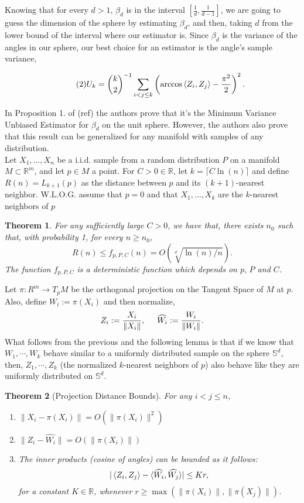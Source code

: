 \documentclass[12pt]{exam}
\def\R{\ensuremath{\mathbb{R}}}
\def\S{\ensuremath{\mathbb{S}}}
\newtheorem{theorem}{Theorem}[section]
\theoremstyle{remark}
\newcommand{\angles}[1]{\ensuremath{\left\langle}#1\ensuremath{\right\rangle} }
\begin{document}
Knowing that for every $d > 1$, $\beta_d$ is in the interval $[\tfrac{1}{d}, \tfrac{1}{d-1}]$, we are going to guess the dimension of the sphere by estimating $\beta_d$, and then, taking $d$ from the lower bound of the interval where our estimator is. Since $\beta_d$ is the variance of the angles in our sphere, our best choice for an estimator is the angle's sample variance,


\begin{equation}\label{ade:2}\tag{2}
  U_{k} = {k \choose 2}^{-1} \sum_{i<j\leq k}\left(
    \arccos\angles{Z_i, Z_j} - \frac{\pi^2}{2} 
    \right)^{2}.
\end{equation}

In Proposition 1. of (ref) the authors prove that it's the Minimum Variance Unbiased Estimator for $\beta_d$ on the unit sphere. However, the authors also prove that this result can be generalized for any manifold with samples of any distribution.\\[5mm]

Let $X_1,\ldots, X_n$ be a i.i.d. sample from a random distribution $P$ on a manifold $M \subset \R^m$, and let $p \in M$ a point. For $C>0 \in  \R$, let $k = \lceil C \ln(n)\rceil$ and define $R(n) = L_{k+1}(p)$ as the distance between $p$ and its $(k+1)$-nearest neighbor. W.L.O.G. assume that $p = 0$ and that $X_1,\ldots, X_k$ are the $k$-nearest neighbors of $p$

\begin{theorem}
  For any sufficiently large $C > 0$, we have that, there exists $n_0$ such that, with probability 1, for every $n \geq n_0$,
  \[ R(n) \leq f_{p,P,C}(n) = O(\sqrt[d]{\ln(n)/n}).\]
  The function $f_{p,P,C}$ is a deterministic function which depends on $p,\, P$ and $C$.
\end{theorem}

Let $\pi : R^m \to T_p M$ be the orthogonal projection on the Tangent Space of $M$ at $p$. Also, define $W_i := \pi(X_i)$ and then normalize,
\[ Z_i := \frac{X_i}{\|X_i\|},\hspace*{5mm} \widehat{W_i} := \frac{W_i}{\|W_i\|}. \] 
What follows from the previous and the following lemma is that if we know that $W_1,\cdots, W_k$ behave similar to a uniformly distributed sample on the sphere $\S^d$, then, $Z_1,\cdots, Z_k$ (the normalized $k$-nearest neighbors of $p$) also behave like they are uniformly distributed on $\S^d$.

\begin{theorem}[Projection Distance Bounds] For any $i<j \leq n$,
  \begin{enumerate}
    \item[(i)]    \( \|X_i-\pi(X_i)\|  =   O(\|\pi (X_i)\|^2) \)
    \item[(ii)]   \( \|Z_i-\widehat{W_i}\|  =   O(\|\pi (X_i) \|) \)
    \item[(iii)]  The inner products (cosine of angles) can be bounded as it follows:
    \[ |\angles{Z_i,Z_j} - \langle\widehat{W_i}, \widehat{W_j}\rangle| \leq K r,\]
    for a constant $K\in\R$, whenever $r \geq \max (\|\pi(X_i)\|,\|\pi(X_j)\|)$.
  \end{enumerate}
  
\end{theorem}
\end{document}
